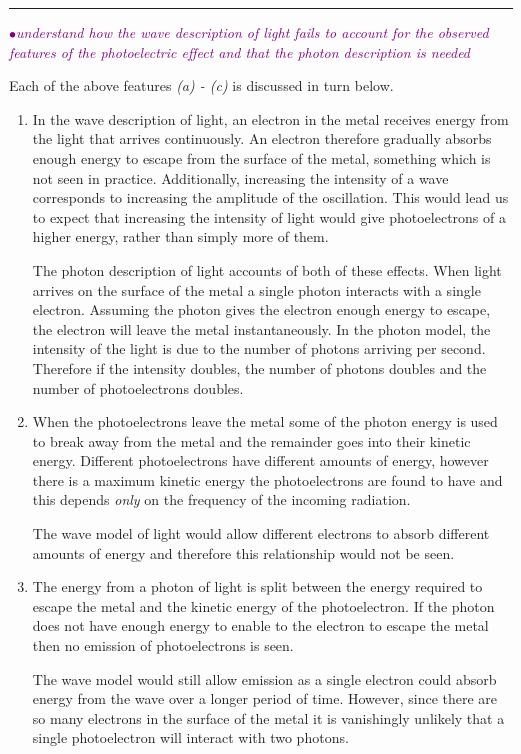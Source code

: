 \documentclass[a4paper,11pt,twoside]{memoir}
\newcounter{spec}[chapter]
\newcommand{\spec}[1]{\Needspace{5\baselineskip}\textcolor{purple}{$\bullet$\hspace{0.5cm}\textit{#1}}}
\begin{document}
\rule{\textwidth}{0.1pt}

\spec{understand how the wave description of light fails to account for the observed features of the photoelectric effect and that the photon description is needed}

Each of the above features \emph{(a) - (c)} is discussed in turn below.

\begin{enumerate}[label=\emph{(\alph*)}]

\item In the wave description of light, an electron in the metal receives energy from the light that arrives continuously. An electron therefore gradually absorbs enough energy to escape from the surface of the metal, something which is not seen in practice. Additionally, increasing the intensity of a wave corresponds to increasing the amplitude of the oscillation. This would lead us to expect that increasing the intensity of light would give photoelectrons of a higher energy, rather than simply more of them.

The photon description of light accounts of both of these effects. When light arrives on the surface of the metal a single photon interacts with a single electron. Assuming the photon gives the electron enough energy to escape, the electron will leave the metal instantaneously. In the photon model, the intensity of the light is due to the number of photons arriving per second. Therefore if the intensity doubles, the number of photons doubles and the number of photoelectrons doubles.

\item When the photoelectrons leave the metal some of the photon energy is used to break away from the metal and the remainder goes into their kinetic energy. Different photoelectrons have different amounts of energy, however there is a maximum kinetic energy the photoelectrons are found to have and this depends \emph{only} on the frequency of the incoming radiation.

The wave model of light would allow different electrons to absorb different amounts of energy and therefore this relationship would not be seen.

\item The energy from a photon of light is split between the energy required to escape the metal and the kinetic energy of the photoelectron. If the photon does not have enough energy to enable to the electron to escape the metal then no emission of photoelectrons is seen.

The wave model would still allow emission as a single electron could absorb energy from the wave over a longer period of time. However, since there are so many electrons in the surface of the metal it is vanishingly unlikely that a single photoelectron will interact with two photons.

\end{enumerate}
\end{document}
